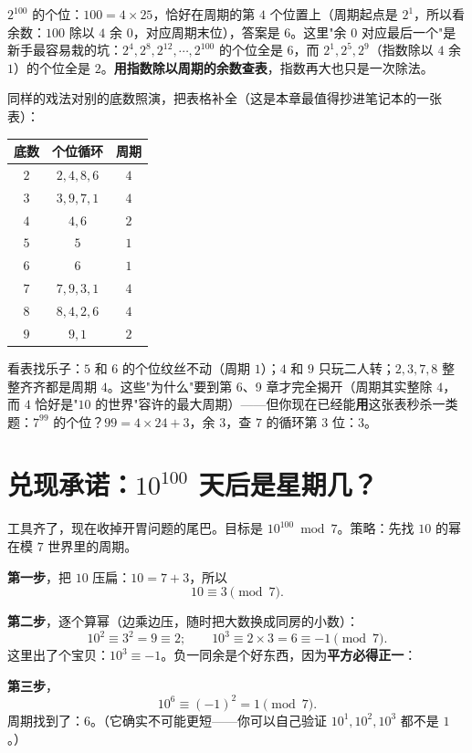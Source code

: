 $2^{100}$ 的个位：$100 = 4\times 25$，恰好在周期的第 $4$ 个位置上（周期起点是 $2^1$，所以看余数：$100$ 除以 $4$ 余 $0$，对应周期末位），答案是 $\boxed{6}$。这里"余 $0$ 对应最后一个"是新手最容易栽的坑：$2^4, 2^8, 2^{12}, \cdots, 2^{100}$ 的个位全是 $6$，而 $2^1, 2^5, 2^9$（指数除以 $4$ 余 $1$）的个位全是 $2$。\textbf{用指数除以周期的余数查表}，指数再大也只是一次除法。

同样的戏法对别的底数照演，把表格补全（这是本章最值得抄进笔记本的一张表）：

\begin{center}
\begin{tabular}{ccc}
\toprule
底数 & 个位循环 & 周期 \\
\midrule
$2$ & $2,4,8,6$ & $4$ \\
$3$ & $3,9,7,1$ & $4$ \\
$4$ & $4,6$ & $2$ \\
$5$ & $5$ & $1$ \\
$6$ & $6$ & $1$ \\
$7$ & $7,9,3,1$ & $4$ \\
$8$ & $8,4,2,6$ & $4$ \\
$9$ & $9,1$ & $2$ \\
\bottomrule
\end{tabular}
\end{center}

看表找乐子：$5$ 和 $6$ 的个位纹丝不动（周期 $1$）；$4$ 和 $9$ 只玩二人转；$2,3,7,8$ 整整齐齐都是周期 $4$。这些"为什么"要到第 6、9 章才完全揭开（周期其实整除 $4$，而 $4$ 恰好是"$10$ 的世界"容许的最大周期）——但你现在已经能\textbf{用}这张表秒杀一类题：$7^{99}$ 的个位？$99 = 4\times 24 + 3$，余 $3$，查 $7$ 的循环第 $3$ 位：$3$。

\section{兑现承诺：$10^{100}$ 天后是星期几？}

工具齐了，现在收掉开胃问题的尾巴。目标是 $10^{100} \bmod 7$。策略：先找 $10$ 的幂在模 $7$ 世界里的周期。

\textbf{第一步}，把 $10$ 压扁：$10 = 7 + 3$，所以
\[
10 \equiv 3 \pmod 7 .
\]

\textbf{第二步}，逐个算幂（边乘边压，随时把大数换成同房的小数）：
\[
10^2 \equiv 3^2 = 9 \equiv 2; \qquad
10^3 \equiv 2 \times 3 = 6 \equiv -1 \pmod 7 .
\]
这里出了个宝贝：$10^3 \equiv -1$。负一同余是个好东西，因为\textbf{平方必得正一}：

\textbf{第三步}，
\[
10^6 \equiv (-1)^2 = 1 \pmod 7 .
\]
周期找到了：$6$。（它确实不可能更短——你可以自己验证 $10^1, 10^2, 10^3$ 都不是 $1$。）

